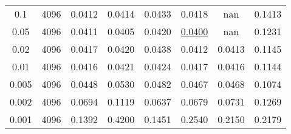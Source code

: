 \begin{table}[h]
\begin{tabular}{c c c c c c c c}
		\hline
		0.1        & 4096               & 0.0412 & 0.0414             & 0.0433 & 0.0418             & nan     & 0.1413 \\
		0.05       & 4096               & 0.0411 & 0.0405             & 0.0420 & \underline{0.0400} & nan     & 0.1231 \\
		0.02       & 4096               & 0.0417 & 0.0420             & 0.0438 & 0.0412             & 0.0413  & 0.1145 \\
		0.01       & 4096               & 0.0416 & 0.0421             & 0.0424 & 0.0417             & 0.0416  & 0.1144 \\
		0.005      & 4096               & 0.0448 & 0.0530             & 0.0482 & 0.0467             & 0.0468  & 0.1074 \\
		0.002      & 4096               & 0.0694 & 0.1119             & 0.0637 & 0.0679             & 0.0731  & 0.1269 \\
		0.001      & 4096               & 0.1392 & 0.4200             & 0.1451 & 0.2540             & 0.2150  & 0.2179 \\
		\hline
	\end{tabular}
\end{table}